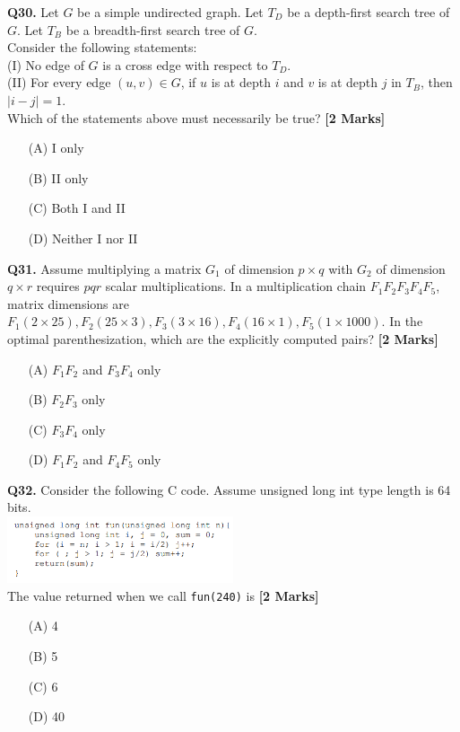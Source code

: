 \documentclass[11pt]{article}
\newcommand{\questionb}[2]{
    \noindent\textbf{Q#2.} #1 \hfill \textbf{[2 Marks]}
}
\begin{document}
\questionb{Let \( G \) be a simple undirected graph. Let \( T_D \) be a depth-first search tree of \( G \). Let \( T_B \) be a breadth-first search tree of \( G \).\\
Consider the following statements:\\
(I) No edge of \( G \) is a cross edge with respect to \( T_D \).\\
(II) For every edge \( (u,v) \in G \), if \( u \) is at depth \( i \) and \( v \) is at depth \( j \) in \( T_B \), then \( |i-j| = 1 \).\\
Which of the statements above must necessarily be true?}{30}
\begin{enumerate}
    \item[(A)] I only
    \item[(B)] II only
    \item[(C)] Both I and II
    \item[(D)] Neither I nor II
\end{enumerate}
\vspace{0.5cm}

\questionb{Assume multiplying a matrix \( G_1 \) of dimension \( p \times q \) with \( G_2 \) of dimension \( q \times r \) requires \( pqr \) scalar multiplications. In a multiplication chain \( F_1F_2F_3F_4F_5 \), matrix dimensions are \( F_1(2 \times 25), F_2(25 \times 3), F_3(3 \times 16), F_4(16 \times 1), F_5(1 \times 1000) \). In the optimal parenthesization, which are the explicitly computed pairs?}{31}
\begin{enumerate}
    \item[(A)] \( F_1F_2 \) and \( F_3F_4 \) only
    \item[(B)] \( F_2F_3 \) only
    \item[(C)] \( F_3F_4 \) only
    \item[(D)] \( F_1F_2 \) and \( F_4F_5 \) only
\end{enumerate}
\vspace{0.5cm}

\questionb{Consider the following C code. Assume unsigned long int type length is 64 bits.\\
\includegraphics[width=0.5\textwidth]{figures/32}\\
The value returned when we call \texttt{fun(240)} is}{32}
\begin{enumerate}
    \item[(A)] 4
    \item[(B)] 5
    \item[(C)] 6
    \item[(D)] 40
\end{enumerate}
\vspace{0.5cm}
\end{document}

